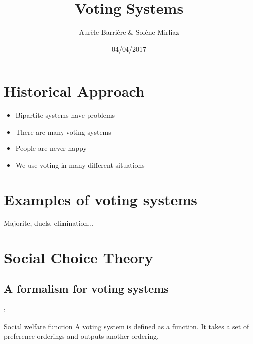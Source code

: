 \documentclass[utf8]{earlywinter}
\title{Voting Systems}
\author{Aur\`ele Barri\`ere \& Sol\`ene Mirliaz}
\date{04/04/2017}
\begin{document}
\begin{frame}
\maketitle
\end{frame}

\section{Historical Approach}
\begin{frame}{\secname}
  \begin{itemize}
  \item Bipartite systems have problems
  \item There are many voting systems
  \item People are never happy
  \item We use voting in many different situations
  \end{itemize}
  
\end{frame}

\section{Examples of voting systems}
\begin{frame}{\secname}
  Majorite, duels, elimination...
\end{frame}



\section{Social Choice Theory}
\subsection{A formalism for voting systems}
\begin{frame}{\secname: \subsecname}


%
%
%
  \begin{block}{Social welfare function}
    A voting system is defined as a function. It takes a set of preference orderings and outputs another ordering.
  \end{block}
 


\end{frame}
\end{document}
